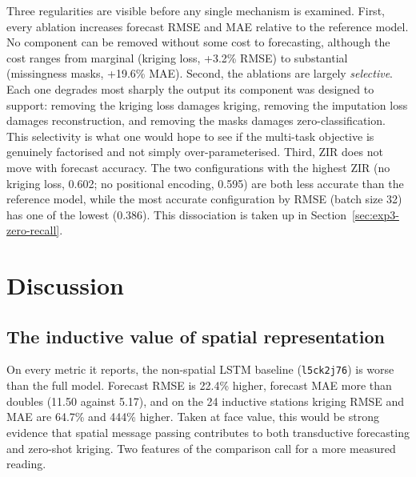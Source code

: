 Three regularities are visible before any single mechanism is examined.
First, every ablation increases forecast RMSE and MAE relative to the
reference model. No component can be removed without some cost to
forecasting, although the cost ranges from marginal (kriging loss,
+3.2\% RMSE) to substantial (missingness masks, +19.6\% MAE). Second, the
ablations are largely \emph{selective}. Each one degrades most sharply
the output its component was designed to support: removing the kriging
loss damages kriging, removing the imputation loss damages
reconstruction, and removing the masks damages zero-classification.
This selectivity is what one would hope to see if the multi-task
objective is genuinely factorised and not simply over-parameterised.
Third, ZIR does not move with forecast accuracy. The two
configurations with the highest ZIR (no kriging loss, 0.602; no
positional encoding, 0.595) are both less accurate than the reference
model, while the most accurate configuration by RMSE (batch size 32) has
one of the lowest (0.386). This dissociation is taken up in
Section~\ref{sec:exp3-zero-recall}.

\section{Discussion}
\label{sec:exp3-discussion}

\subsection{The inductive value of spatial representation}
\label{sec:exp3-spatial}

On every metric it reports, the non-spatial LSTM baseline
(\texttt{l5ck2j76}) is worse than the full model. Forecast RMSE is 22.4\%
higher, forecast MAE more than doubles (11.50 against 5.17), and on the
24 inductive stations kriging RMSE and MAE are 64.7\% and 444\% higher.
Taken at face value, this would be strong evidence that spatial message
passing contributes to both transductive forecasting and zero-shot
kriging. Two features of the comparison call for a more measured
reading.

